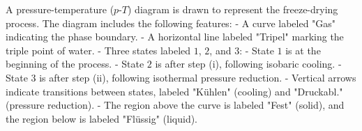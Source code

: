 A pressure-temperature (\( p \)-\( T \)) diagram is drawn to represent the freeze-drying process. The diagram includes the following features:  
- A curve labeled "Gas" indicating the phase boundary.  
- A horizontal line labeled "Tripel" marking the triple point of water.  
- Three states labeled \( 1 \), \( 2 \), and \( 3 \):  
  - State \( 1 \) is at the beginning of the process.  
  - State \( 2 \) is after step (i), following isobaric cooling.  
  - State \( 3 \) is after step (ii), following isothermal pressure reduction.  
- Vertical arrows indicate transitions between states, labeled "Kühlen" (cooling) and "Druckabl." (pressure reduction).  
- The region above the curve is labeled "Fest" (solid), and the region below is labeled "Flüssig" (liquid).